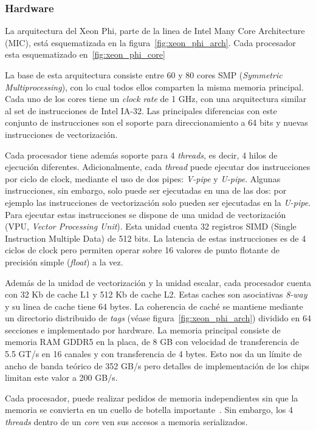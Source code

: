 \subsubsection{Hardware}

La arquitectura del Xeon Phi, parte de la linea de Intel Many Core Architecture (MIC), est\'a esquematizada
en la figura~\ref{fig:xeon_phi_arch}. Cada procesador esta esquematizado en~\ref{fig:xeon_phi_core}

La base de esta arquitectura consiste entre 60 y 80 cores SMP (\textit{Symmetric Multiprocessing}), con lo cual todos
ellos comparten la misma memoria principal. Cada uno de los cores tiene un \textit{clock rate} de 1 GHz,
con una arquitectura similar al set de instrucciones de Intel IA-32. Las principales diferencias con este
conjunto de instrucciones son el soporte para direccionamiento a 64 bits y nuevas instrucciones de vectorizaci\'on.

Cada procesador tiene adem\'as soporte para 4 \textit{threads}, es decir, 4 hilos de ejecuci\'on diferentes. Adicionalmente,
cada \textit{thread} puede ejecutar dos instrucciones por ciclo de clock, mediante el uso de dos pipes: \textit{V-pipe} y \textit{U-pipe}.
Algunas instrucciones, sin embargo, solo puede ser ejecutadas en una de las dos: por ejemplo las instrucciones de vectorizaci\'on solo pueden
ser ejecutadas en la \textit{U-pipe}. Para ejecutar estas instrucciones se dispone de una unidad de vectorizaci\'on (VPU, \textit{Vector Processing Unit}).
Esta unidad cuenta 32 registros SIMD (Single Instruction Multiple Data) de 512 bits. La latencia de estas instrucciones es de 4 ciclos de clock pero permiten
operar sobre 16 valores de punto flotante de precisi\'on simple (\textit{float}) a la vez.

Adem\'as de la unidad de vectorizaci\'on y la unidad escalar, cada procesador cuenta con 32 Kb de cache L1 y 512 Kb de cache
L2. Estas caches son asociativas \textit{8-way} y su linea de cache tiene 64 bytes. La coherencia de cach\'e se mantiene
mediante un directorio distribuido de \textit{tags} (v\'ease figura~\ref{fig:xeon_phi_arch}) dividido en 64 secciones e implementado
por hardware. La memoria principal consiste de memoria RAM GDDR5 en la placa, de 8 GB con velocidad de transferencia de 5.5 GT/s en 16 canales y con transferencia de 4
bytes. Esto nos da un l\'imite de ancho de banda te\'orico de 352 GB/s pero detalles de implementaci\'on de los chips limitan este valor a 200 GB/s.

Cada procesador, puede realizar pedidos de memoria independientes sin que la memoria se convierta en un cuello
de botella importante~\cite{Fang}. Sin embargo, los 4 \textit{threads} dentro de un \textit{core} ven sus accesos a memoria serializados.

